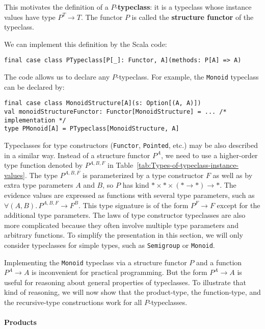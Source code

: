 This motivates the definition of  a $P$-\textbf{typeclass}:
it is a typeclass whose instance values have type $P^{T}\rightarrow T$.
The functor $P$ is called the \textbf{structure
functor} of the typeclass.

We can implement this definition by the Scala code:
\begin{lstlisting}
final case class PTypeclass[P[_]: Functor, A](methods: P[A] => A)
\end{lstlisting}
The code allows us to declare any $P$-typeclass. For example, the
\lstinline!Monoid! typeclass can be declared by:
\begin{lstlisting}
final case class MonoidStructure[A](s: Option[(A, A)])
val monoidStructureFunctor: Functor[MonoidStructure] = ... /* implementation */
type PMonoid[A] = PTypeclass[MonoidStructure, A]
\end{lstlisting}

Typeclasses for type constructors (\lstinline!Functor!, \lstinline!Pointed!,
etc.) may be also described in a similar way. Instead of a structure
functor $P^{A}$, we need to use a higher-order type function denoted
by $P^{A,B,F}$ in Table~\ref{tab:Types-of-typeclass-instance-values}.
The type $P^{A,B,F}$ is parameterized by a type constructor $F$
as well as by extra type parameters $A$ and $B$, so $P$ has kind
$*\times*\times(*\rightarrow*)\rightarrow*$. The evidence values
are expressed as functions with several type parameters, such as $\forall(A,B).\,P^{A,B,F}\rightarrow F^{B}$.
This type signature is of the form $P^{F}\rightarrow F$ except for
the additional type parameters. The laws of type constructor typeclasses
are also more complicated because they often involve multiple type
parameters and arbitrary functions. To simplify the presentation in
this section, we will only consider typeclasses for simple types,
such as \lstinline!Semigroup! or \lstinline!Monoid!.

Implementing the \lstinline!Monoid! typeclass via a structure functor
$P$ and a function $P^{A}\rightarrow A$ is inconvenient for practical
programming. But the form $P^{A}\rightarrow A$ is useful for reasoning
about general properties of typeclasses. To illustrate that kind of
reasoning, we will now show that the product-type, the function-type,
and the recursive-type constructions work for all $P$-typeclasses. 

\paragraph{Products}

